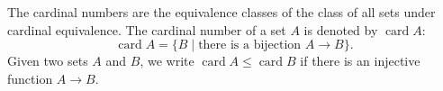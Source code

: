 The cardinal numbers are the equivalence classes of the class of all sets under cardinal equivalence. The cardinal number of a set $A$ is denoted by $\operatorname{card} A$:
$$\operatorname{card} A = \{ B \mid \text{there is a bijection } A \to B \}.$$
Given two sets $A$ and $B$, we write $\operatorname{card} A \leq \operatorname{card} B$ if there is an injective function $A \to B$.
